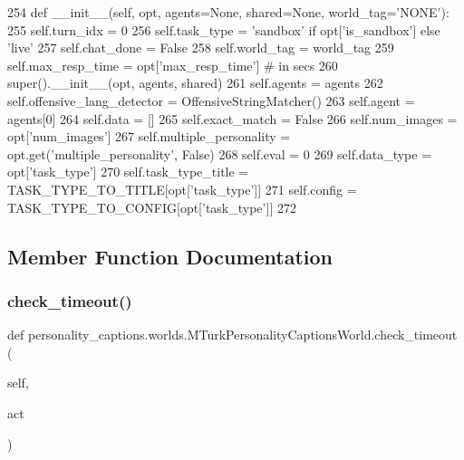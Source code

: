 \begin{DoxyCode}
254     \textcolor{keyword}{def }\_\_init\_\_(self, opt, agents=None, shared=None, world\_tag='NONE'):
255         self.turn\_idx = 0
256         self.task\_type = \textcolor{stringliteral}{'sandbox'} \textcolor{keywordflow}{if} opt[\textcolor{stringliteral}{'is\_sandbox'}] \textcolor{keywordflow}{else} \textcolor{stringliteral}{'live'}
257         self.chat\_done = \textcolor{keyword}{False}
258         self.world\_tag = world\_tag
259         self.max\_resp\_time = opt[\textcolor{stringliteral}{'max\_resp\_time'}]  \textcolor{comment}{# in secs}
260         super().\_\_init\_\_(opt, agents, shared)
261         self.agents = agents
262         self.offensive\_lang\_detector = OffensiveStringMatcher()
263         self.agent = agents[0]
264         self.data = []
265         self.exact\_match = \textcolor{keyword}{False}
266         self.num\_images = opt[\textcolor{stringliteral}{'num\_images'}]
267         self.multiple\_personality = opt.get(\textcolor{stringliteral}{'multiple\_personality'}, \textcolor{keyword}{False})
268         self.eval = 0
269         self.data\_type = opt[\textcolor{stringliteral}{'task\_type'}]
270         self.task\_type\_title = TASK\_TYPE\_TO\_TITLE[opt[\textcolor{stringliteral}{'task\_type'}]]
271         self.config = TASK\_TYPE\_TO\_CONFIG[opt[\textcolor{stringliteral}{'task\_type'}]]
272 
\end{DoxyCode}


\subsection{Member Function Documentation}
\mbox{\label{classpersonality__captions_1_1worlds_1_1MTurkPersonalityCaptionsWorld_a594560fccee92084ad833d131c77d860}} 
\subsubsection{\texorpdfstring{check\+\_\+timeout()}{check\_timeout()}}
{\footnotesize\ttfamily def personality\+\_\+captions.\+worlds.\+M\+Turk\+Personality\+Captions\+World.\+check\+\_\+timeout (\begin{DoxyParamCaption}\item[{}]{self,  }\item[{}]{act }\end{DoxyParamCaption})}



